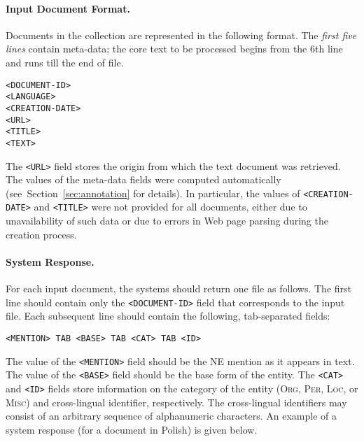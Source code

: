 \documentclass[11pt]{article}
\begin{document}
\paragraph{Input Document Format.}
\label{subsec:input}
%
Documents in the collection are represented in the following format.  The {\em first five
  lines} contain meta-data; the core text to be processed begins from the 6th line and runs
till the end of file.

\begin{small}
\begin{verbatim}
<DOCUMENT-ID>
<LANGUAGE>
<CREATION-DATE>
<URL>
<TITLE>
<TEXT>
\end{verbatim}
\end{small}

\noindent The \verb+<URL>+ field stores the origin from which the text document was retrieved.
The values of the meta-data fields were computed automatically
(see~Section~\ref{sec:annotation} for details). In particular, the values of
\verb+<CREATION-DATE>+ and \verb+<TITLE>+ were not provided for all documents, either due to
unavailability of such data or due to errors in Web page parsing during the creation process.

\paragraph{System Response.}
\label{subsec:input}
%
For each input document, the systems should return one file as follows.  The first line should
contain only the \verb+<DOCUMENT-ID>+ field that corresponds to the input file.  Each
subsequent line should contain the following, tab-separated fields:

\begin{small}
\begin{verbatim}
<MENTION> TAB <BASE> TAB <CAT> TAB <ID>
\end{verbatim}
\end{small}

\noindent The value of the \verb+<MENTION>+ field should be the NE mention as it appears in
text.  The value of the \verb+<BASE>+ field should be the base form of the entity.  The
\verb+<CAT>+ and \verb+<ID>+ fields store information on the category of the entity
(\textsc{Org}, \textsc{Per}, \textsc{Loc}, or \textsc{Misc}) and cross-lingual identifier,
respectively.  The cross-lingual identifiers may consist of an arbitrary sequence of
alphanumeric characters.  An example of a system response (for a document in Polish) is given
below.
\end{document}
